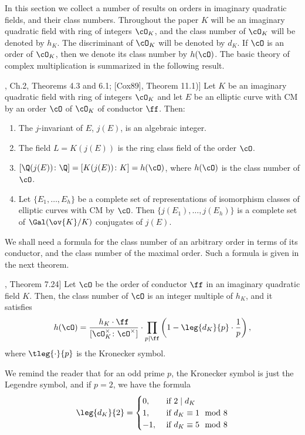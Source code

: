 In this section we collect a number of results on orders in imaginary quadratic fields, and their class numbers. Throughout the paper $K$ will be an imaginary quadratic field with ring of integers $\cO_K$, and the class number of $\cO_K$ will be denoted by $h_K$. The discriminant of $\cO_K$ will be denoted by $d_K$. If $\cO$ is an order of $\cO_K$, then we denote its class number by $h(\cO)$. The basic theory of complex multiplication is summarized in the following result.


\begin{thm}[[Sil94], Ch.2, Theorems 4.3 and 6.1; [Cox89], Theorem 11.1)] %
Let $K$ be an imaginary quadratic field with ring of integers $\cO_K$ and let $E$ be an elliptic curve with CM by an order $\cO$ of $\cO_K$ of conductor $\ff$. Then:
	\begin{enumerate}[(1)]
	\item The $j$-invariant of $E$, $j(E)$, is an algebraic integer.
	\item The field $L= K(j(E))$ is the ring class field of the order $\cO$.
	\item $[\Q(j(E)) \colon \Q]= [K(j(E)) \colon K]= h(\cO)$, where $h(\cO)$ is the class number of $\cO$.
	\item Let $\{ E_1, \ldots, E_h \}$ be a complete set of representations of isomorphism classes of elliptic curves with CM by $\cO$. Then $\{ j(E_1), \ldots, j(E_h) \}$ is a complete set of $\Gal(\ov{K}/K)$ conjugates of $j(E)$. 
	\end{enumerate}
\end{thm}


We shall need a formula for the class number of an arbitrary order in terms of its conductor, and the class number of the maximal order. Such a formula is given in the next theorem.


\begin{thm}[([Cox89], Theorem 7.24] %
Let $\cO$ be the order of conductor $\ff$ in an imaginary quadratic field $K$. Then, the class number of $\cO$ is an integer multiple of $h_K$, and it satisfies
	\[
	h(\cO)= \dfrac{h_K \cdot \ff}{[\cO_K^\times \colon \cO^\times]} \cdot \prod_{p \mid \ff} \left( 1 - \leg{d_K}{p} \cdot \dfrac{1}{p} \right),
	\]
where $\tleg{\cdot}{p}$ is the Kronecker symbol. 
\end{thm}


We remind the reader that for an odd prime $p$, the Kronecker symbol is just the Legendre symbol, and if $p= 2$, we have the formula
	\[
	\leg{d_K}{2}= 
	\begin{cases}
	0, & \text{ if } 2 \mid d_K \\
	1, & \text{ if } d_K \equiv 1 \mod 8 \\
	-1, & \text{ if } d_K \equiv 5 \mod 8
	\end{cases}
	\]


